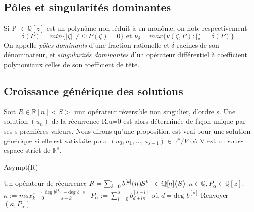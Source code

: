\documentclass[a4paper,10.5pt]{article}
\begin{document}
	\subsection{Pôles et singularités dominantes}
	
	\begin{definition} Si P $\in \mathbb{Q}[z]$ est un polynôme non réduit à un monôme, on note respectivement
		\[\delta(P)=min\{|\zeta| \neq 0: P(\zeta)=0\} \text{ et } \nu_{\delta}=max\{\nu(\zeta,P):|\zeta|=\delta(P)\}\] 
		On appelle \textit{pôles dominants} d'une fraction rationelle et $\delta$-racines  de son dénominateur, et \textit{singularités dominantes} d'un opérateur différentiel à coefficient polynomiaux celles de son coefficient de tête.  
	\end{definition}
	
	\subsection{Croissance générique des solutions}
	
	\begin{definition} Soit $R \in \mathbb{R}[n]\big< S\big>$ unn opérateur réversible non singulier, d'ordre s. Une solution $(u_{n})$ de la récurrence R.u=0 est alors déterminée de façon unique par ses s premières valeurs. Nous dirons qu'une proposition est vrai pour une solution générique si elle est satisfaite pour $(u_{0},u_{1},...,u_{s-1}) \in \mathbb{R}^{s}/V$ où V est un sous-espace strict de $\mathbb{R}^{s}$.
		
	\end{definition}
	
	\begin{algorithm}
		\caption{Asympt(R)}
		\begin{algorithmic}[1]
			\REQUIRE Un opérateur de récurrence $R=\sum_{k=0}^{s} b^{[k]}(n)S^{k} \hspace{2mm} \in \mathbb{Q}[n]\big<S\big>$
			\vspace{4mm}
			\ENSURE $\kappa \in \mathbb{Q}, P_{\alpha} \in \mathbb{Q}[z].$
			\vspace{4mm}
			\STATE $\kappa:= max_{k=0}^{s-1}\frac{\text{deg } b^{[k]}-\text{deg } b{[s]}}{s-k}$
			\vspace{4mm}
			\STATE $P_{\alpha}:=\sum_{l=0}^{s} b_{d+l\kappa}^{[s-l]}\text{ où } d=\text{deg } b^{[s]}$
			\vspace{4mm}
			\STATE Renvoyer $(\kappa,P_{\alpha})$
		\end{algorithmic}
		
	\end{algorithm}
	
\end{document}
